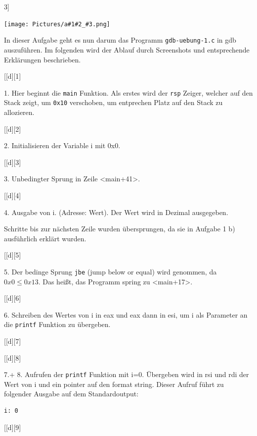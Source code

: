 \documentclass[12pt]{article}
\begin{document}
\newcommand{\imageseriesExcercise}[1][2][3]{
\begin{center}
   \texttt{[image: Pictures/a\#1\#2\_\#3.png]}
\end{center}

\newcommand{\imageseries}[1]{
\begin{center}
	\imageseriesExcercise[1][d][#1]
\end{center}
}

In dieser Aufgabe geht es nun darum das Programm \texttt{gdb-uebung-1.c} in gdb auszuführen. Im folgenden wird der Ablauf durch Screenshots und entsprechende Erklärungen beschrieben.

\imageseries{1}


1. Hier beginnt die \texttt{main} Funktion. Als erstes wird der \texttt{rsp} Zeiger, welcher auf den Stack zeigt, um \texttt{0x10} verschoben, um entprechen Platz auf den Stack zu allozieren.

\imageseries{2}

2. Initialisieren der Variable i  mit 0x0.

\imageseries{3}

3. Unbedingter Sprung in Zeile <main+41>.

\imageseries{4}

4. Ausgabe von i. (Adresse: Wert). Der Wert wird in Dezimal ausgegeben.

Schritte bis zur nächsten Zeile wurden übersprungen, da sie in Aufgabe 1 b) ausführlich erklärt wurden.

\imageseries{5}

5. Der bedinge Sprung \texttt{jbe} (jump below or equal) wird genommen, da $ 0x0 \le 0x13$. Das heißt, das Programm spring zu <main+17>.

\imageseries{6}

6. Schreiben des Wertes von i in eax und eax dann in esi, um i als Parameter an die \texttt{printf} Funktion zu übergeben.

\imageseries{7}
\imageseries{8}

7.+ 8. Aufrufen der \texttt{printf} Funktion mit i=0. Übergeben wird in rsi und rdi der Wert von i und ein pointer auf den format string. Dieser Aufruf führt zu folgender Ausgabe auf dem Standardoutput:

\begin{lstlisting}
i: 0
\end{lstlisting}

\imageseries{9}

}
\end{document}
